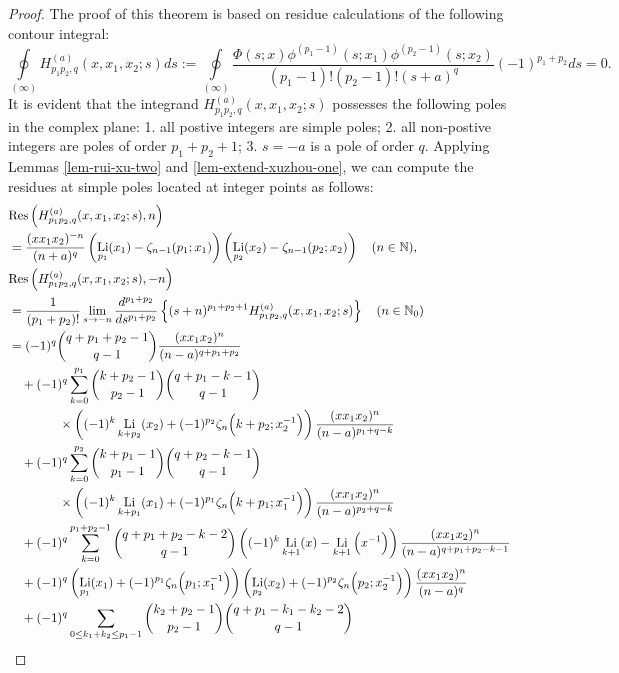 \documentclass[11pt]{article}
\newcommand\Res{{\rm Res}}
\DeclareMathOperator{\Li}{Li}
\def\N{\mathbb{N}}
\theoremstyle{plain}
\theoremstyle{definition}
\begin{document}
\begin{proof}
The proof of this theorem is based on residue calculations of the following contour integral:
\[\oint\limits_{\left( \infty  \right)}H^{(a)}_{p_1p_2,q}(x,x_1,x_2;s)ds:= \oint\limits_{\left( \infty  \right)}\frac{\Phi(s;x)\phi^{(p_1-1)}(s;x_1)\phi^{(p_2-1)}(s;x_2)}{(p_1-1)!(p_2-1)!(s+a)^q} (-1)^{p_1+p_2}ds=0.\]
It is evident that the integrand $H^{(a)}_{p_1p_2,q}(x,x_1,x_2;s)$ possesses the following poles in the complex plane: 1. all postive integers are simple poles; 2. all non-postive integers are poles of order $p_1+p_2+1$; 3. $s=-a$ is a pole of order $q$. Applying Lemmas \ref{lem-rui-xu-two} and \ref{lem-extend-xuzhou-one}, we can compute the residues at simple poles located at integer points as follows:
\begin{align*}
	&\Res\left(H^{(a)}_{p_1p_2,q}(x,x_1,x_2;s),n\right)\\
	&=\frac{(xx_1x_2)^{-n}}{(n+a)^q}\left(\Li_{p_1}(x_1)-\zeta_{n-1}(p_1;x_1)\right)\left(\Li_{p_2}(x_2)-\zeta_{n-1}(p_2;x_2)\right)\quad (n\in \N),\\
	&\Res\left(H^{(a)}_{p_1p_2,q}(x,x_1,x_2;s),-n\right)\\
	&=\frac1{(p_1+p_2)!}\lim_{s\rightarrow -n} \frac{d^{p_1+p_2}}{ds^{p_1+p_2}}\left\{(s+n)^{p_1+p_2+1}H^{(a)}_{p_1p_2,q}(x,x_1,x_2;s)\right\}\quad (n\in\N_0)\\
	&=(-1)^q\binom{q+p_1+p_2-1}{q-1}\frac{(xx_1x_2)^n}{(n-a)^{q+p_1+p_2}}\\
	&\quad+(-1)^q\sum_{k=0}^{p_{1}}\binom{k+p_2-1}{p_{2}-1}\binom{q+p_{1}-k-1}{q-1}\\
	&\qquad\qquad\times\left((-1)^k\Li_{k+p_2}(x_{2})+(-1)^{p_{2}}\zeta_n\Big(k+p_{2};x_{2}^{-1}\Big)\right)\frac{(xx_1x_2)^n}{(n-a)^{p_{1}+q-k}}\\
	&\quad+(-1)^q\sum_{k=0}^{p_{2}}\binom{k+p_{1}-1}{p_{1}-1}\binom{q+p_{2}-k-1}{q-1}\\
	&\qquad\qquad\times\left((-1)^k\Li_{k+p_1}(x_{1})+(-1)^{p_{1}}\zeta_n\Big(k+p_{1};x_{1}^{-1}\Big)\right)\frac{(xx_1x_2)^n}{(n-a)^{p_{2}+q-k}}\\
	&\quad+(-1)^q\sum_{k=0}^{p_1+p_2-1}\binom{q+p_1+p_2-k-2}{q-1}\left((-1)^k\Li_{k+1}(x)-\Li_{k+1}\Big(x^{-1}\Big)\right)\frac{(xx_1x_2)^n}{(n-a)^{q+p_1+p_2-k-1}}\\
	&\quad+(-1)^q\left(\Li_{p_1}(x_1)+(-1)^{p_1}\zeta_n\Big(p_1;x_1^{-1}\Big)\right)\left(\Li_{p_2}(x_2)+(-1)^{p_2}\zeta_n\Big(p_2;x_2^{-1}\Big)\right)\frac{(xx_1x_2)^n}{(n-a)^{q}}\\
	&\quad+(-1)^q\sum_{0\le k_1+k_2\le p_{1}-1}\binom{k_2+p_{2}-1}{p_{2}-1}\binom{q+p_{1}-k_1-k_2-2}{q-1}\nonumber\\

\end{align*}
\end{proof}
\end{document}
